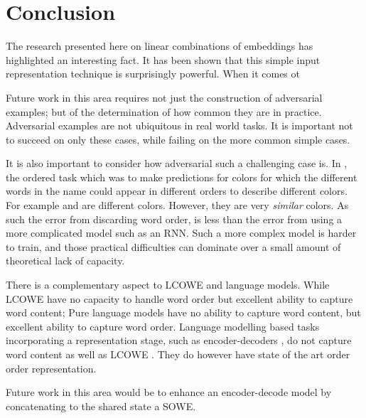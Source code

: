 \documentclass{book}
\begin{document}
	
\chapter{Conclusion}
The research presented here on linear combinations of embeddings has highlighted an interesting fact.
It has been shown that this simple input representation technique is surprisingly powerful.
When it comes ot 


Future work in this area requires not just the construction of adversarial examples; but of the determination of how common they are in practice.
Adversarial examples are not ubiquitous in real world tasks.
It is important not to succeed on only these cases, while failing on the more common simple cases.

It is also important to consider how adversarial such a challenging case is.
In , the ordered task which was to make predictions for colors for which the different words in the name could appear in different orders to describe different colors.
For example  and  are different colors.
However, they are very \emph{similar} colors.
As such the error from discarding word order, is less than the error from using a more complicated model such as an RNN.
Such a more complex model is harder to train, and those practical difficulties can dominate over a small amount of theoretical lack of capacity.


There is a complementary aspect to LCOWE and language models.
While LCOWE have no capacity to handle word order but excellent ability to capture word content;
Pure language models have no ability to capture word content, but excellent ability to capture word order.
Language modelling based tasks incorporating a representation stage, such as encoder-decoders \citep{cho-EtAl:2014:EMNLP2014}, do not capture word content as well as LCOWE \citep{ac2018probingsentencevectors}.
They do however have state of the art order order representation.

Future work in this area would be to enhance an encoder-decode model by concatenating to the shared state a SOWE.
\end{document}
